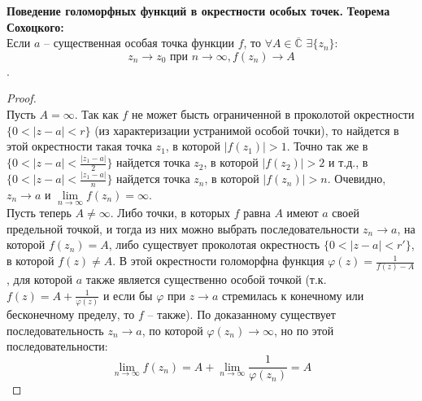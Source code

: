 \textbf{Поведение голоморфных функций в окрестности особых точек.}
\textbf{Теорема Сохоцкого:}\\
Если $a$ -- существенная особая точка функции $f$, то $\forall A \in \overline{\mathbb{C}}$ $\exists \{z_n\}:$ 
$$z_n \rightarrow z_0 \text{ при } n \rightarrow \infty, f(z_n) \rightarrow A$$.\\[2mm]

\begin{proof}
    \ \\
    Пусть $A=\infty$. Так как $f$ не может бысть ограниченной в проколотой окрестности $\{0<|z-a|<r\}$ (из характеризации устранимой особой точки), то найдется в этой окрестности такая точка $z_1$, в которой $|f(z_1)|>1$. Точно так же в $\{0<|z-a|<\frac{|z_1-a|}{2}\}$ найдется точка $z_2$, в которой $|f(z_2)|>2$ и т.д., в $\{0<|z-a|<\frac{|z_1-a|}{n}\}$ найдется точка $z_n$, в которой $|f(z_n)|>n$. Очевидно, $z_n \to a$ и $\lim\limits_{n\to\infty} f(z_n)=\infty$.\\[2mm]
    Пусть теперь $A\neq \infty$. Либо точки, в которых $f$ равна $A$ имеют $a$ своей предельной точкой, и тогда из них можно выбрать последовательности $z_n \to a$, на которой $f(z_n)=A$, либо существует проколотая окрестность $\{0<|z-a|<r'\}$, в которой $f(z)\neq A$. В этой окрестности голоморфна функция $\varphi(z)=\frac{1}{f(z)-A}$, для которой $a$ также является существенно особой точкой (т.к. $f(z)=A+\frac{1}{\varphi(z)}$ и если бы $\varphi$ при $z\to a$ стремилась к конечному или бесконечному пределу, то $f$ -- также). По доказанному существует последовательность $z_n\to a$, по которой $\varphi(z_n)\to \infty$, но по этой последовательности:
    $$\lim\limits_{n\to \infty}f(z_n)=A+\lim\limits_{n\to\infty}\frac{1}{\varphi(z_n)}=A$$
\end{proof}
